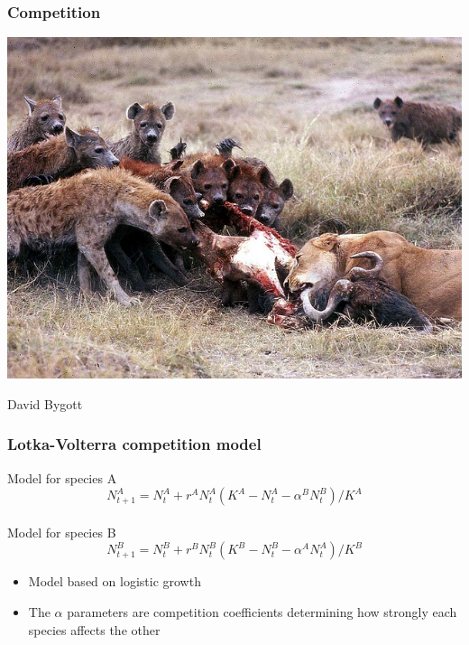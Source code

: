 \documentclass[color=usenames,dvipsnames]{beamer}\usepackage[]{graphicx}\usepackage[]{xcolor}
\begin{document}
\begin{frame}
  \frametitle{Competition}
  \begin{center}
    \includegraphics[width=.95\textwidth]{figs/Hyena_lion} \par
    \vspace{-0.5cm} \hspace{.75\textwidth}
    {\tiny David Bygott \par}
  \end{center}
\end{frame}




\begin{frame}
  \frametitle{Lotka-Volterra competition model}
  \Large
  Model for species A
  \[
    N^A_{t+1} = N^A_t + r^A N^A_t(K^A - N^A_t - \alpha^B N^B_t) / K^A
  \] \\
  \vfill %
  \pause
  Model for species B
  \[
    N^B_{t+1} = N^B_t + r^B N^B_t(K^B - N^B_t - \alpha^A N^A_t) / K^B
  \]
  \pause
  \vfill
  \normalsize
  \begin{itemize}
  \item Model based on logistic growth
  \item The $\alpha$ parameters are competition coefficients
    determining how strongly each species affects the other
  \end{itemize}
\end{frame}
\end{document}
